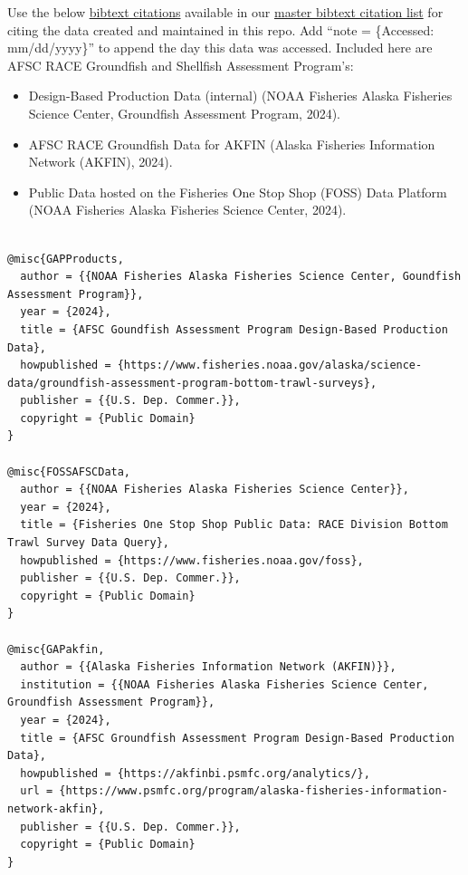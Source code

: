 \documentclass[
  letterpaper,
  oneside,
  open=any]{scrbook}
\providecommand{\tightlist}{%
  \setlength{\itemsep}{0pt}\setlength{\parskip}{0pt}}\usepackage{longtable,booktabs,array}
\begin{document}

Use the below
\href{https://github.com/afsc-gap-products/gap_products/blob/main/CITATION.bib}{bibtext
citations} available in our
\href{https://github.com/afsc-gap-products/gap_products/blob/main/content/references.bib}{master
bibtext citation list} for citing the data created and maintained in
this repo. Add ``note = \{Accessed: mm/dd/yyyy\}'' to append the day
this data was accessed. Included here are AFSC RACE Groundfish and
Shellfish Assessment Program's:

\begin{itemize}
\tightlist
\item
  Design-Based Production Data (internal) (NOAA Fisheries Alaska
  Fisheries Science Center, Groundfish Assessment Program, 2024).\\
\item
  AFSC RACE Groundfish Data for AKFIN (Alaska Fisheries Information
  Network (AKFIN), 2024).
\item
  Public Data hosted on the Fisheries One Stop Shop (FOSS) Data Platform
  (NOAA Fisheries Alaska Fisheries Science Center, 2024).
\end{itemize}

\begin{verbatim}

@misc{GAPProducts,
  author = {{NOAA Fisheries Alaska Fisheries Science Center, Goundfish Assessment Program}},
  year = {2024}, 
  title = {AFSC Goundfish Assessment Program Design-Based Production Data},
  howpublished = {https://www.fisheries.noaa.gov/alaska/science-data/groundfish-assessment-program-bottom-trawl-surveys},
  publisher = {{U.S. Dep. Commer.}},
  copyright = {Public Domain} 
}

@misc{FOSSAFSCData,
  author = {{NOAA Fisheries Alaska Fisheries Science Center}},
  year = {2024}, 
  title = {Fisheries One Stop Shop Public Data: RACE Division Bottom Trawl Survey Data Query},
  howpublished = {https://www.fisheries.noaa.gov/foss},
  publisher = {{U.S. Dep. Commer.}},
  copyright = {Public Domain} 
}

@misc{GAPakfin,
  author = {{Alaska Fisheries Information Network (AKFIN)}}, 
  institution = {{NOAA Fisheries Alaska Fisheries Science Center, Groundfish Assessment Program}},
  year = {2024}, 
  title = {AFSC Groundfish Assessment Program Design-Based Production Data},
  howpublished = {https://akfinbi.psmfc.org/analytics/},
  url = {https://www.psmfc.org/program/alaska-fisheries-information-network-akfin},
  publisher = {{U.S. Dep. Commer.}},
  copyright = {Public Domain} 
}
\end{verbatim}
\end{document}
